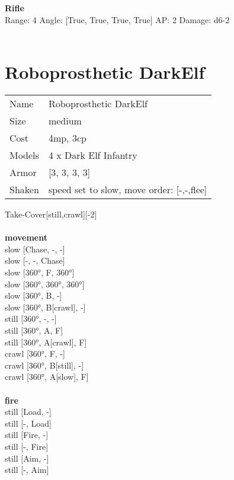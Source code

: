 \ \\

\ \\
{\bf Rifle } \\



Range: 4  Angle: [True, True, True, True] AP: 2 Damage: d6-2 \\




 
\ \\













\clearpage

\section{ Roboprosthetic DarkElf }

\begin{tabular}{ll}
  Name & Roboprosthetic DarkElf \\
  Size & medium\\
  Cost & 4mp, 3cp\\
  Models & 4 x Dark Elf Infantry\\
  Armor & [3, 3, 3, 3]\\
  Shaken & speed set to slow, move order: [-,-,flee]\\
\end{tabular}

\noindent Take-Cover[still,crawl][-2]\\ 


\ \\ {\bf movement } \\
slow [Chase, -, -] \\
slow [-, -, Chase] \\
slow [360°, F, 360°] \\
slow [360°, 360°, 360°] \\
slow [360°, B, -] \\
slow [360°, B[crawl], -] \\
still [360°, -, -] \\
still [360°, A, F] \\
still [360°, A[crawl], F] \\
crawl [360°, F, -] \\
crawl [360°, B[still], -] \\
crawl [360°, A[slow], F] \\
\ \\ {\bf fire } \\
still [Load, -] \\
still [-, Load] \\
still [Fire, -] \\
still [-, Fire] \\
still [Aim, -] \\
still [-, Aim] \\


